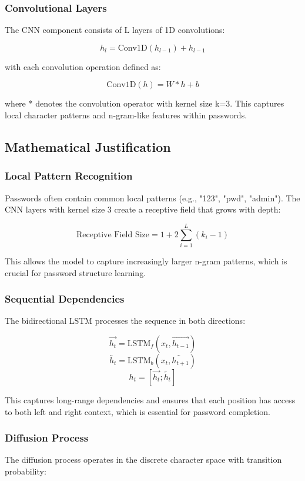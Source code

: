 \subsubsection{Convolutional Layers}
The CNN component consists of L layers of 1D convolutions:

$$h_l = \text{Conv1D}(h_{l-1}) + h_{l-1}$$

with each convolution operation defined as:

$$\text{Conv1D}(h) = W * h + b$$

where * denotes the convolution operator with kernel size k=3. This captures local character patterns and n-gram-like features within passwords.

\subsection{Mathematical Justification}

\subsubsection{Local Pattern Recognition}
Passwords often contain common local patterns (e.g., "123", "pwd", "admin"). The CNN layers with kernel size 3 create a receptive field that grows with depth:

$$\text{Receptive Field Size} = 1 + 2\sum_{i=1}^{L} (k_i - 1)$$

This allows the model to capture increasingly larger n-gram patterns, which is crucial for password structure learning.

\subsubsection{Sequential Dependencies}
The bidirectional LSTM processes the sequence in both directions:

$$\vec{h_t} = \text{LSTM}_f(x_t, \vec{h_{t-1}})$$
$$\overleftarrow{h_t} = \text{LSTM}_b(x_t, \overleftarrow{h_{t+1}})$$
$$h_t = [\vec{h_t}; \overleftarrow{h_t}]$$

This captures long-range dependencies and ensures that each position has access to both left and right context, which is essential for password completion.

\subsubsection{Diffusion Process}
The diffusion process operates in the discrete character space with transition probability:


